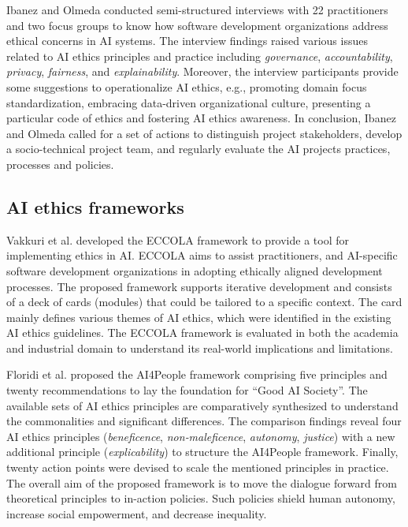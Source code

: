 Ibanez and Olmeda \cite{ibanez2021operationalising} conducted semi-structured interviews with 22 practitioners and two focus groups to know how software development organizations address ethical concerns in AI systems. The interview findings raised various issues related to AI ethics principles and practice including \textit{governance}, \textit{accountability}, \textit{privacy}, \textit{fairness}, and \textit{explainability}. Moreover, the interview participants provide some suggestions to operationalize AI ethics, e.g., promoting domain focus standardization, embracing data-driven organizational culture, presenting a particular code of ethics and fostering AI ethics awareness. In conclusion, Ibanez and Olmeda \cite{ibanez2021operationalising} called for a set of actions to distinguish project stakeholders, develop a socio-technical project team, and regularly evaluate the AI projects practices, processes and policies.

\subsection{AI ethics frameworks}
Vakkuri et al. \cite{vakkuri2021eccola} developed the ECCOLA framework to provide a tool for implementing ethics in AI. ECCOLA aims to assist practitioners, and AI-specific software development organizations in adopting ethically aligned development processes. The proposed framework supports iterative development and consists of a deck of cards (modules) that could be tailored to a specific context. The card mainly defines various themes of AI ethics, which were identified in the existing AI ethics guidelines. The ECCOLA framework is evaluated in both the academia and industrial domain to understand its real-world implications and limitations. 

Floridi et al. \cite{floridi2018ai4people} proposed the AI4People framework comprising five principles and twenty recommendations to lay the foundation for “Good AI Society”. The available sets of AI ethics principles are comparatively synthesized to understand the commonalities and significant differences. The comparison findings reveal four AI ethics principles (\textit{beneficence}, \textit{non‑maleficence}, \textit{autonomy}, \textit{justice}) with a new additional principle  (\textit{explicability}) to structure the AI4People framework. Finally, twenty action points were devised to scale the mentioned principles in practice. The overall aim of the proposed framework is to move the dialogue forward from theoretical principles to in-action policies. Such policies shield human autonomy, increase social empowerment, and decrease inequality.

